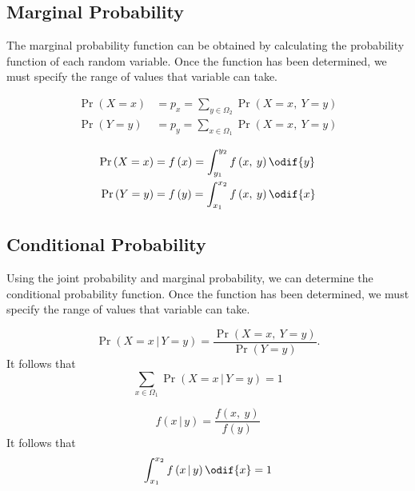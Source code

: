 \documentclass{article}
\begin{document}
\subsection{Marginal Probability}
The marginal probability function can be obtained by calculating the probability function of each random variable.
Once the function has been determined, we must specify the range of values that variable can take.
\begin{definition}
    \begin{align*}
        \Pr{\left( X = x \right)} & = p_x = \sum_{y \in \Omega_2} \Pr{\left( X = x,\: Y = y \right)} \\
        \Pr{\left( Y = y \right)} & = p_y = \sum_{x \in \Omega_1} \Pr{\left( X = x,\: Y = y \right)}
    \end{align*}
\end{definition}
\begin{definition}
    \begin{align*}
        \Pr{\left( X = x \right)} & = f\left( x \right) = \int_{y_1}^{y_2} f\left( x,\: y \right) \odif{y} \\
        \Pr{\left( Y = y \right)} & = f\left( y \right) = \int_{x_1}^{x_2} f\left( x,\: y \right) \odif{x}
    \end{align*}
\end{definition}
\subsection{Conditional Probability}
Using the joint probability and marginal probability, we can determine the conditional probability function.
Once the function has been determined, we must specify the range of values that variable can take.
\begin{definition}
    \begin{equation*}
        \Pr{\left( X = x \,\vert\, Y = y \right)} = \frac{\Pr{\left( X = x,\: Y = y \right)}}{\Pr{\left( Y = y \right)}}.
    \end{equation*}
    It follows that
    \begin{equation*}
        \sum_{x \in \Omega_1} \Pr{\left( X = x \,\vert\, Y = y \right)} = 1
    \end{equation*}
\end{definition}
\begin{definition}
    \begin{equation*}
        f\left( x \,\vert\, y \right) = \frac{f\left( x,\: y \right)}{f\left( y \right)}
    \end{equation*}
    It follows that
    \begin{equation*}
        \int_{x_1}^{x_2} f\left( x \,\vert\, y \right) \odif{x} = 1
    \end{equation*}
\end{definition}
\end{document}
